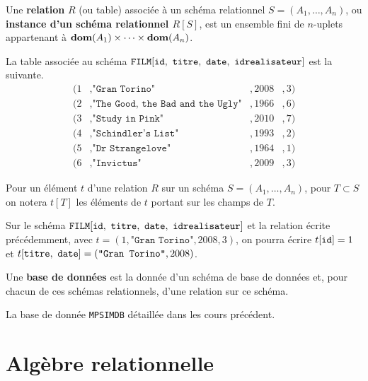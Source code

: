 
\begin{defi}[Relation]
  Une \textbf{relation} $R$ (ou table) associée à un schéma relationnel $S = (A_1,\dots,A_n)$, ou \textbf{instance
    d'un schéma relationnel $R[S]$}, est un ensemble fini de $n$-uplets appartenant à $\mathbf{dom}(A_1) \times \dots \times \mathbf{dom}(A_n)$.
\end{defi}

\begin{exemple}
  La table associée au schéma $\FILM[\ttid,\ \tttitre,\ \ttdate,\ \ttidr]$ est la suivante. 
  \begin{align*}
    (1&,\texttt{"Gran Torino"}&,2008&,3)\\
    (2&,\texttt{"The Good, the Bad and the Ugly"}&,1966&,6) \\
    (3&,\texttt{"Study in Pink"}&,2010&,7)\\
    (4&,\texttt{"Schindler's List"}&,1993&,2)\\
    (5&,\texttt{"Dr Strangelove"}&,1964&,1)\\
    (6&,\texttt{"Invictus"}&,2009&,3)
  \end{align*}
\end{exemple}

Pour un élément $t$ d'une relation $R$ sur un schéma $S = (A_1,\dots,A_n)$, pour $T  \subset S$ on notera $t[T]$ les éléments de $t$ portant sur les champs de $T$. 

\begin{exemple}
  Sur le schéma $\FILM[\ttid,\ \tttitre,\ \ttdate,\ \ttidr]$ et la relation écrite précédemment, avec 
$    t = (1,\texttt{"Gran Torino"},2008,3)$,   on pourra écrire $ t[\mathtt{id}] = 1$  et 
$ t[\mathtt{titre},\ \mathtt{date}]  =(\texttt{"Gran Torino"},2008)$.
\end{exemple}


\begin{defi}
  Une \textbf{base de données} est la donnée d'un schéma de base de données et, pour chacun de ces schémas relationnels, d'une relation sur ce schéma. 
\end{defi}

\begin{exemple}
  La base de donnée \texttt{MPSIMDB} détaillée dans les cours précédent.
\end{exemple}

\section{Algèbre relationnelle}

